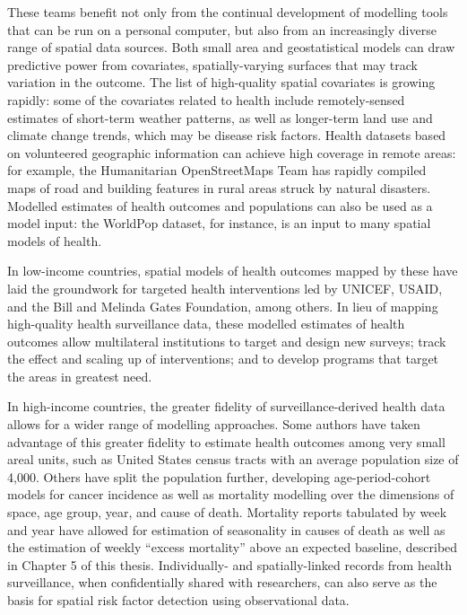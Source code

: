 \documentclass[
]{report}
\begin{document}
These teams benefit not only from the continual development of modelling tools that can be run on a personal computer, but also from an increasingly diverse range of spatial data sources. Both small area and geostatistical models can draw predictive power from covariates, spatially-varying surfaces that may track variation in the outcome. The list of high-quality spatial covariates is growing rapidly: some of the covariates related to health include remotely-sensed estimates of short-term weather patterns, as well as longer-term land use and climate change trends, which may be disease risk factors.\autocite{Ericksen2011} Health datasets based on volunteered geographic information can achieve high coverage in remote areas: for example, the Humanitarian OpenStreetMaps Team has rapidly compiled maps of road and building features in rural areas struck by natural disasters.\autocite{Thomson2019} Modelled estimates of health outcomes and populations can also be used as a model input: the WorldPop dataset, for instance, is an input to many spatial models of health.\autocite{Tatem2017}

In low-income countries, spatial models of health outcomes mapped by these have laid the groundwork for targeted health interventions led by UNICEF, USAID, and the Bill and Melinda Gates Foundation, among others. In lieu of mapping high-quality health surveillance data, these modelled estimates of health outcomes allow multilateral institutions to target and design new surveys; track the effect and scaling up of interventions; and to develop programs that target the areas in greatest need.\autocite{Diggle2016,Pigott2015}

In high-income countries, the greater fidelity of surveillance-derived health data allows for a wider range of modelling approaches. Some authors have taken advantage of this greater fidelity to estimate health outcomes among very small areal units, such as United States census tracts with an average population size of 4,000.\autocite{Dwyer-Lindgren2017,Zhang2014} Others have split the population further, developing age-period-cohort models for cancer incidence\autocite{Papoila2014} as well as mortality modelling over the dimensions of space, age group, year, and cause of death.\autocite{Dwyer-Lindgren2016} Mortality reports tabulated by week and year have allowed for estimation of seasonality in causes of death as well as the estimation of weekly ``excess mortality'' above an expected baseline, described in Chapter 5 of this thesis.\autocite{Weinberger2020a} Individually- and spatially-linked records from health surveillance, when confidentially shared with researchers, can also serve as the basis for spatial risk factor detection using observational data.
\end{document}
